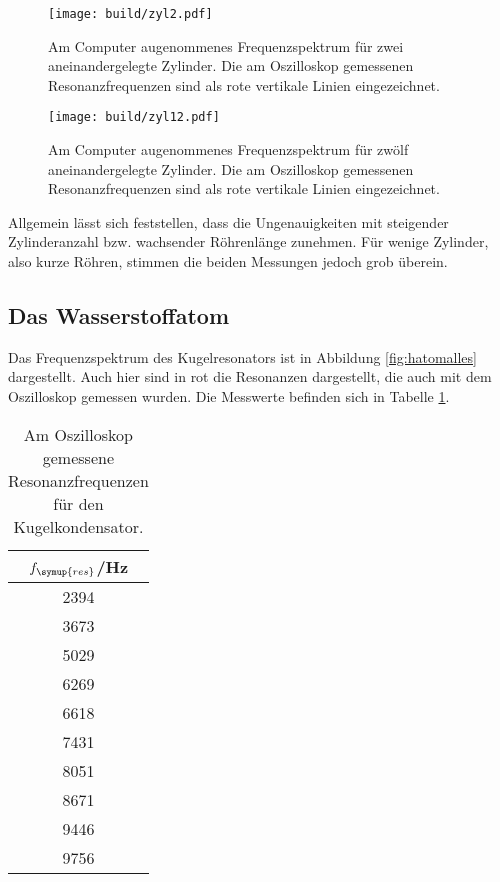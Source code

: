 \begin{figure}
  \centering
  \texttt{[image: build/zyl2.pdf]}
  \caption{Am Computer augenommenes Frequenzspektrum für zwei aneinandergelegte
  Zylinder. Die am Oszilloskop gemessenen Resonanzfrequenzen sind als rote vertikale
  Linien eingezeichnet.}
  \label{fig:zyl2}
\end{figure}
\begin{figure}
  \centering
  \texttt{[image: build/zyl12.pdf]}
  \caption{Am Computer augenommenes Frequenzspektrum für zwölf aneinandergelegte
  Zylinder. Die am Oszilloskop gemessenen Resonanzfrequenzen sind als rote vertikale
  Linien eingezeichnet.}
  \label{fig:zyl12}
\end{figure}


Allgemein lässt sich feststellen, dass die Ungenauigkeiten mit steigender Zylinderanzahl
bzw. wachsender Röhrenlänge zunehmen. Für wenige Zylinder, also kurze Röhren, stimmen
die beiden Messungen jedoch grob überein.

\subsection{Das Wasserstoffatom}
\label{subsec:hatom}

Das Frequenzspektrum des Kugelresonators ist in Abbildung \ref{fig:hatomalles} dargestellt.
Auch hier sind in rot die Resonanzen dargestellt, die auch mit dem Oszilloskop
gemessen wurden. Die Messwerte befinden sich in Tabelle \ref{tab:oszires}.

\begin{table}[htp]
	\begin{center}
    \caption{Am Oszilloskop gemessene Resonanzfrequenzen für den Kugelkondensator.}
		\label{tab:oszires}
		\begin{tabular}{c}
		\toprule
			{$f_\symup{res}$/Hz}\\
			\midrule
			2394\\
			3673\\
			5029\\
			6269\\
			6618\\
			7431\\
			8051\\
			8671\\
			9446\\
			9756\\
		\bottomrule
		\end{tabular}
	\end{center}
\end{table}

